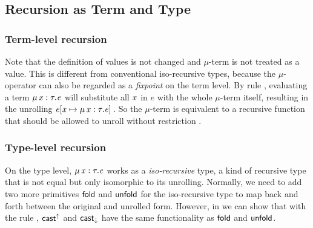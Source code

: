 \subsection{Recursion as Term and Type}
\subsubsection{Term-level recursion}
Note that the definition of values is not changed and $ \mu $-term is not treated as a value. This is different from conventional iso-recursive types, because the $ \mu $-operator can also be regarded as a \emph{fixpoint} on the term level. By rule , evaluating a term $\mu \, \mathit{x}  :  \tau  .  \mathit{e}$ will substitute all $\mathit{x}$ in $e$ with the whole $ \mu $-term itself, resulting in the unrolling $\mathit{e}  [  \mathit{x}  \mapsto  \mu \, \mathit{x}  :  \tau  .  \mathit{e}  ] \,$. So the $ \mu $-term is equivalent to a recursive function that should be allowed to unroll without restriction .

\subsubsection{Type-level recursion}
On the type level, $\mu \, \mathit{x}  :  \tau  .  \mathit{e}$ works as a \emph{iso-recursive} type, a kind of recursive type that is not equal but only isomorphic to its unrolling. Normally, we need to add two more primitives $\mathsf{fold}$ and $\mathsf{unfold}$ for the iso-recursive type to map back and forth between the original and unrolled form. However, in \name we can show that with the rule , $ \mathsf{cast}^{\uparrow} $ and $ \mathsf{cast}_{\downarrow} $ have the same functionality as $\mathsf{fold}$ and $\mathsf{unfold}$.

